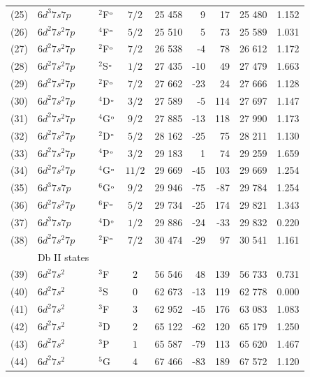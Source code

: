 \documentclass[10pt,a4paper, twoside]{report}
\begin{document}
\begin{table}[p!]
\begin{adjustwidth}{-1.3cm}{-1.3cm}
\begin{tabular}{cllcrrrrr}
 (25)  & $6d^3 7s 7p$  &  $^2$F$^{\rm_o}$ &  $7/2$  &  25 458 & 9  & 17  & 25 480 & 1.152 \\ 
(26) &   $6d^2 7s^2 7p$  &  $^4$F$^{\rm_o}$ &  $5/2$ &  25 510 & 5   & 73 & 25 589 & 1.031 \\ 
(27)   & $6d^2 7s^2 7p$  &  $^2$F$^{\rm_o}$ &  $7/2$ &  26 538 & -4   &  78 & 26 612 & 1.172 \\ 
(28)   &  $6d^2 7s^2 7p$  &  $^2$S$^{\rm_o}$ &  $1/2$ &  27 435 & -10   &  49 & 27 479 & 1.663 \\ 
(29)  &   $6d^2 7s^2 7p$  &  $^2$F$^{\rm_o}$ &  $7/2$  &  27 662 & -23   & 24  & 27 666 & 1.128  \\ 
(30)  &  $6d^2 7s^2 7p$  &  $^4$D$^{\rm_o}$ &  $3/2$ &  27 589 & -5   & 114 & 27 697  & 1.147 \\ 
(31)  &  $6d^2 7s^2 7p$  &  $^4$G$^{\rm_o}$ &  $9/2$ &  27 885 & -13   &  118 & 27 990 & 1.173 \\ 
(32)   & $6d^2 7s^2 7p$  &  $^2$D$^{\rm_o}$ &  $5/2$ &  28 162 & -25  & 75 & 28 211  & 1.130 \\ 
(33)    &  $6d^2 7s^2 7p$  &  $^4$P$^{\rm_o}$ &  $3/2$ &  29 183 & 1  & 74 & 29 259 & 1.659 \\ 
(34)  & $6d^2 7s^2 7p$  &  $^4$G$^{\rm_o}$ &  $11/2$ &  29 669 & -45 & 103 & 29 669 & 1.254 \\ 
(35)  & $6d^3 7s 7p$  &  $^6$G$^{\rm_o}$ &  $9/2$ &  29 946 & -75  & -87 & 29 784 & 1.254 \\ 
(36)  &   $6d^2 7s^2 7p$  &  $^6$F$^{\rm_o}$  & $5/2$ &  29 734 &  -25  & 174  & 29 821 & 1.343 \\ 
(37) &  $6d^3 7s 7p$  &  $^4$D$^{\rm_o}$ &  $1/2$ &  29 886 & -24  &  -33  & 29 832 & 0.220 \\ 
(38)  &  $6d^2 7s^2 7p$  &  $^2$F$^{\rm_o}$  &  $7/2$ &  30 474 & -29  & 97 & 30 541  & 1.161 \\ 
 & Db II states\\
(39)  &   $6d^2 7s^2$  &  $^3$F &  $2$ & 56 546 & 48 & 139 & 56 733 & 0.731 \\ 
(40)  &   $6d^2 7s^2$  &  $^3$S &  $0$ & 62 673 & -13 & 119 & 62 778 & 0.000 \\ 
(41)  &   $6d^2 7s^2$  &  $^3$F &  $3$ & 62 952 & -45 & 176 & 63 083 & 1.083 \\ 
(42)  &   $6d^2 7s^2$  &  $^3$D &  $2$ & 65 122 & -62 & 120 & 65 179 & 1.250 \\ 
(43)  &   $6d^2 7s^2$  &  $^3$P &  $1$ & 65 587 & -79 & 113 & 65 620 & 1.467 \\ 
(44)  &   $6d^2 7s^2$  &  $^5$G &  $4$ & 67 466 & -83 & 189 & 67 572 & 1.120 \\ 
\bottomrule 
 \bottomrule 
\end{tabular} 
\end{adjustwidth}
\end{table}
\end{document}
